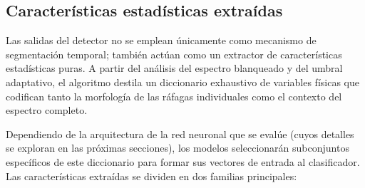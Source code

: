 \begin{table}[htbp]
\caption{Firma espectral característica de los emisores coexistentes en la banda ISM de 2.4\,GHz, para $N_w = 2048$ y $\beta = 4.0$.}
\label{tab:bins_activos_protocolo}
\vspace{0.1cm}
\centering
\small
{}
\end{table}

\subsection{Características estadísticas extraídas}
\label{subsec:features_fisicas}

Las salidas del detector no se emplean únicamente como mecanismo de segmentación temporal; también actúan como un extractor de características estadísticas puras. A partir del análisis del espectro blanqueado y del umbral adaptativo, el algoritmo destila un diccionario exhaustivo de variables físicas que codifican tanto la morfología de las ráfagas individuales como el contexto del espectro completo.

Dependiendo de la arquitectura de la red neuronal que se evalúe (cuyos detalles se exploran en las próximas secciones), los modelos seleccionarán subconjuntos específicos de este diccionario para formar sus vectores de entrada al clasificador. Las características extraídas se dividen en dos familias principales:

